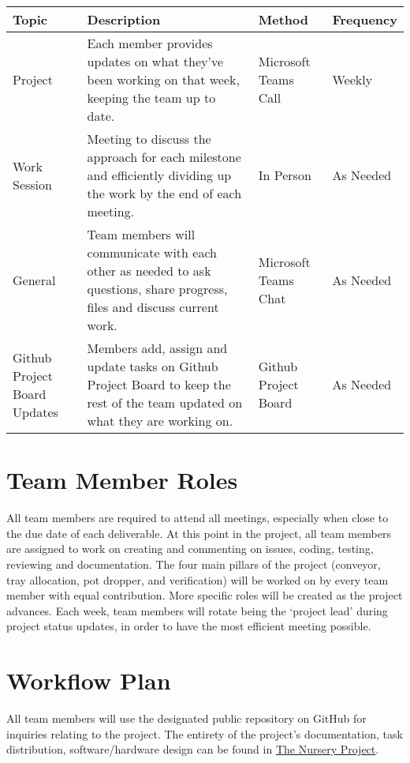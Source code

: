 \documentclass{article}
\begin{document}
	\begin{table}[hp]
		\label{crouch}
		\begin{tabular}{ p{2.4cm}  p{5 cm} p{2 cm} p{1.5 cm}}
			\toprule     
	 \textbf{Topic}   
	& \textbf{Description} 
	& \textbf{Method} 
	& \textbf{Frequency} \\\midrule
	
	 Project \vspace{ Status Updates}   
	& Each member provides updates on what they’ve been working on that week, keeping the team up to date.   
	& Microsoft Teams Call
	& Weekly\\\hline
		 
	Work Session                   
	& Meeting to discuss the approach for each milestone and efficiently dividing up the work by the end of each meeting.  
	& In Person
	& As Needed\\\hline
		  
	General \vspace {Discussion and Updates } 
	& Team members will communicate with each other as needed to ask questions, share progress, files and discuss current work.
	& Microsoft Teams Chat
	& As Needed\\\hline
	
	Github Project Board Updates       
	& Members add, assign and update tasks on Github Project Board to keep the rest of the team updated on what they are working on.
	& Github Project Board
	& As Needed\\
			\bottomrule
		\end{tabular}
	\end{table}
	\clearpage
	\section{Team Member Roles}
	All team members are required to attend all meetings, especially when close to the 
	due date of each deliverable. At this point in the project, all team members are 
	assigned to work on creating and commenting on issues, coding, testing, reviewing 
	and documentation. The four main pillars of the project (conveyor, tray allocation, 
	pot dropper, and verification) will be worked on by every team member with equal 
	contribution. More specific roles will be created as the project advances. 
	Each week, team members will rotate being the ‘project lead’ during project 
	status updates, in order to have the most efficient meeting possible. 

	\section{Workflow Plan}
	All team members will use the designated public repository on GitHub 
	for inquiries relating to the project. The entirety of the project's 
	documentation, task distribution, software/hardware design can be found 
	in \href{https://github.com/aaronbilly22/The_Nursery_Project}{The Nursery Project}.
	
\end{document}
